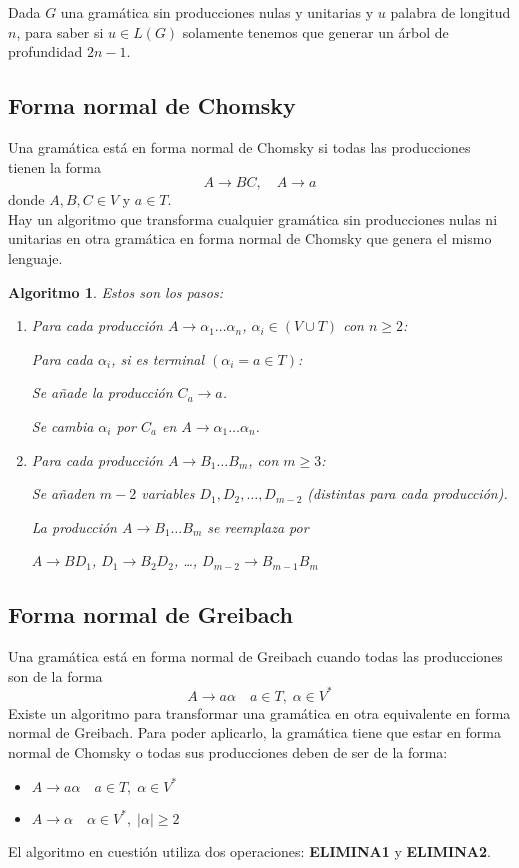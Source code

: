 \documentclass[11pt,titlepage,a4paper]{article}
\theoremstyle{ejemplo}
\theoremstyle{algoritmo}
\newtheorem*{alg}{Algoritmo} %
\begin{document}
Dada $G$ una gramática sin producciones nulas y unitarias y $u$ palabra de
longitud $n$, para saber si $u\in L(G)$ solamente tenemos que generar un árbol
de profundidad $2n-1$.

\subsection{Forma normal de Chomsky}

Una gramática está en forma normal de Chomsky si todas las producciones tienen
la forma
$$A\to BC,\quad A\to a$$
donde $A,B,C\in V$ y $a\in T$.
\\

Hay un algoritmo que transforma cualquier gramática sin producciones nulas ni
unitarias en otra gramática en forma normal de Chomsky que genera el mismo
lenguaje.

\begin{alg}
Estos son los pasos:
\begin{enumerate}[noitemsep]
	\item Para cada producción $A\to\alpha_1\dots\alpha_n$, $\alpha_i\in(V\cup 
	T)$ con $n\geq 2$:
	
	\quad\quad Para cada $\alpha_i$, si es terminal $(\alpha_i=a\in T)$:
	
	\quad\quad\quad\quad Se añade la producción $C_a\to a$.
	
	\quad\quad\quad\quad Se cambia $\alpha_i$ por $C_a$ en $A\to\alpha_1\dots
	\alpha_n$.
	\item Para cada producción $A\to B_1\dots B_m$, con $m\geq 3$:
	
	\quad\quad Se añaden $m-2$ variables $D_1,D_2,\dots,D_{m-2}$ (distintas para
	cada producción).
	
	\quad\quad La producción $A\to B_1\dots B_m$ se reemplaza por
	
	\quad\quad$A\to BD_1$, $D_1\to B_2D_2$, \dots, $D_{m-2}\to B_{m-1}B_m$
\end{enumerate}
\end{alg}

\subsection{Forma normal de Greibach}

Una gramática está en forma normal de Greibach cuando todas las producciones son
de la forma
$$A\to a\alpha\quad a\in T,\;\alpha\in V^*$$
Existe un algoritmo para transformar una gramática en otra equivalente en forma
normal de Greibach. Para poder aplicarlo, la gramática tiene que estar en forma
normal de Chomsky o todas sus producciones deben de ser de la forma:
\begin{itemize}[noitemsep]
	\item $A\to a\alpha\quad a\in T,\;\alpha\in V^*$
	\item $A\to\alpha\quad \alpha\in V^*,\;|\alpha|\geq 2$
\end{itemize}
El algoritmo en cuestión utiliza dos operaciones: \textbf{ELIMINA1} y 
\textbf{ELIMINA2}.
\end{document}
